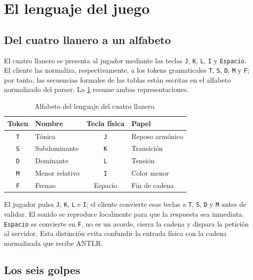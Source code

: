 \documentclass[9pt]{ieeeconf}
\newcommand{\tk}[1]{\texttt{#1}}
\begin{document}
\section{El lenguaje del juego}
\label{sec:diseno}

\subsection{Del cuatro llanero a un alfabeto}
\label{sec:alfabeto}

El cuatro llanero se presenta al jugador mediante las teclas \texttt{J}, \texttt{K}, \texttt{L}, \texttt{I} y \texttt{Espacio}. El cliente las normaliza, respectivamente, a los tokens gramaticales \texttt{T}, \texttt{S}, \texttt{D}, \texttt{M} y \texttt{F}; por tanto, las secuencias formales de las tablas están escritas en el alfabeto normalizado del parser. La \cref{tab:alfabeto} resume ambas representaciones.

\begin{table}[t]
\centering
\caption{Alfabeto del lenguaje del cuatro llanero.}
\label{tab:alfabeto}
\setlength{\tabcolsep}{4pt}
\begin{tabular}{c l c l}
\toprule
\textbf{Token} & \textbf{Nombre} & \textbf{Tecla física} & \textbf{Papel} \\
\midrule
\tk{T} & Tónica & \texttt{J} & Reposo armónico \\
\tk{S} & Subdominante & \texttt{K} & Transición \\
\tk{D} & Dominante & \texttt{L} & Tensión \\
\tk{M} & Menor relativo & \texttt{I} & Color menor \\
\tk{F} & Frenao & Espacio & Fin de cadena \\
\bottomrule
\end{tabular}
\end{table}

El jugador pulsa \texttt{J}, \texttt{K}, \texttt{L} e \texttt{I}; el cliente convierte esas teclas a \texttt{T}, \texttt{S}, \texttt{D} y \texttt{M} antes de validar. El sonido se reproduce localmente para que la respuesta sea inmediata. \texttt{Espacio} se convierte en \texttt{F}, no es un acorde, cierra la cadena y dispara la petición al servidor. Esta distinción evita confundir la entrada física con la cadena normalizada que recibe ANTLR.

\subsection{Los seis golpes}
\label{sec:golpes}
\end{document}
